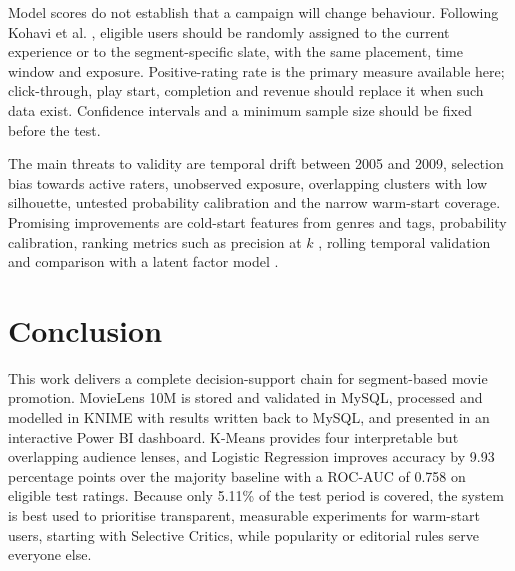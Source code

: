 \documentclass[conference]{IEEEtran}
\begin{document}
Model scores do not establish that a campaign will change behaviour. Following Kohavi et al. \cite{b11}, eligible users should be randomly assigned to the current experience or to the segment-specific slate, with the same placement, time window and exposure. Positive-rating rate is the primary measure available here; click-through, play start, completion and revenue should replace it when such data exist. Confidence intervals and a minimum sample size should be fixed before the test.

The main threats to validity are temporal drift between 2005 and 2009, selection bias towards active raters, unobserved exposure, overlapping clusters with low silhouette, untested probability calibration and the narrow warm-start coverage. Promising improvements are cold-start features from genres and tags, probability calibration, ranking metrics such as precision at $k$ \cite{b9}, rolling temporal validation and comparison with a latent factor model \cite{b3}.

\section{Conclusion}
This work delivers a complete decision-support chain for segment-based movie promotion. MovieLens 10M is stored and validated in MySQL, processed and modelled in KNIME with results written back to MySQL, and presented in an interactive Power BI dashboard. K-Means provides four interpretable but overlapping audience lenses, and Logistic Regression improves accuracy by 9.93 percentage points over the majority baseline with a ROC-AUC of 0.758 on eligible test ratings. Because only 5.11\% of the test period is covered, the system is best used to prioritise transparent, measurable experiments for warm-start users, starting with Selective Critics, while popularity or editorial rules serve everyone else.
\end{document}
